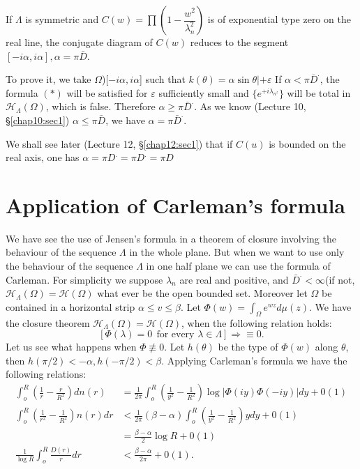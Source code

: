 \begin{theorem*}
 If $\Lambda$ is symmetric and $C(w)= \prod (1 -
 \dfrac{w^2}{\lambda^2_n})$ is of exponential type zero on the real
 line, the conjugate diagram of $C(w)$ reduces to the segment $[- i
 \alpha, i \alpha], \alpha = \pi \bar{D}$.	 
\end{theorem*}

To prove it, we take $\Omega$)[$-i \alpha, i \alpha$] such that
$k(\theta)=\alpha \sin \theta | + \varepsilon $ If $\alpha < \pi \bar{D}^.$, the
formula $(*)$ will be satisfied for $\varepsilon$ sufficiently small
and $\{ e^{+i \lambda_{n^z}} \}$ will be total in
$\mathscr{H}_{\Lambda}(\Omega)$, which is false. Therefore $\alpha \ge
\pi \bar{D}^.$. As we know (Lecture 10, \S \ref{chap10:sec1}) $\alpha \le \pi
\bar{D}$, we have $\alpha = \pi \bar{D}^.$. 

We shall see later (Lecture 12, \S \ref{chap12:sec1}) that if $C(u)$ is bounded on
the real axis, one has $\alpha = \pi D^. = \pi D^. = \pi D$ 

\section{Application of Carleman's formula}\label{chap11:sec2}%

We have see the use of Jensen's formula in a theorem of closure
involving the behaviour of the sequence $\Lambda$ in the whole
plane. But when we want to use only the behaviour of the sequence
$\Lambda$ in one half plane we can use the formula of Carleman. For
simplicity we suppose $\lambda_n$ are real and positive, and
$\bar{D}^. < \infty$(if
not, $\mathscr{H}_\Lambda (\Omega) = \mathscr{H}(\Omega)$ what ever be
the open bounded set. Moreover let $\Omega$ be contained in a horizontal
strip $\alpha \le v \le \beta$. Let $\Phi(w) = \int_\Omega e^{wz} d
\mu (z)$. We have the closure theorem $\mathscr{H}_\Lambda(\Omega) =
\mathscr{H}(\Omega)$, when the following relation holds: 
$$
[\Phi (\lambda) = 0~~ \text{for every } \lambda \in \Lambda ]
\Rightarrow \equiv 0. 
$$
Let us see what happens when $\Phi \nequiv 0$. Let $h(\theta)$ be the
type of $\Phi(w)$ along $\theta$, then $h(\pi/2) < - \alpha, h(- \pi /
2) < \beta$. Applying Carleman's formula we have the following
relations: 
\begin{align*}
 \int^R_o \left(\frac{1}{r} - \frac{r}{R^2}\right) dn(r) & = \frac{1}{2 \pi}
 \int^R_o \left(\frac{1}{y^2} - \frac{1}{R^2}\right) \log | \Phi (iy) \Phi
 (-iy)| dy + 0 (1) \\ 
 \int^R_o \left(\frac{1}{r^2} - \frac{1}{R^2}\right) n(r) dr & <
 \frac{1}{2 \pi} 
 (\beta - \alpha) \int^R_o \left(\frac{1}{y^2} - \frac{1}{R^2}\right) y dy +
 0(1) \\ 
 & = \frac{\beta - \alpha}{2} \log R + 0(1) \\
 \frac{1}{\log R} \int^R_o \frac{D(r)}{r} dr & < \frac{\beta- \alpha}{2
 \pi} + 0(1). 
\end{align*}

